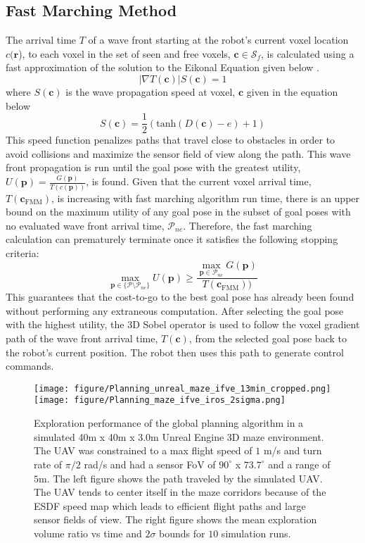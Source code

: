 \documentclass[letterpaper, 10 pt, conference]{ieeeconf}  %
\begin{document}
\subsection{Fast Marching Method}
The arrival time $T$ of a wave front starting at the robot's current voxel location $c(\bm{r}$), to each voxel in the set of seen and free voxels, $\bm{c} \in \mathcal{S}_f$, is calculated using a fast approximation of the solution to the Eikonal Equation given below \cite{hassouna2007multistencils} \cite{kroon2020MSFM}.
\begin{equation}
    |\nabla T(\bm{c})|S(\bm{c}) = 1
\end{equation}
where $S(\bm{c})$ is the wave propagation speed at voxel, $\bm{c}$ given in the equation below
\begin{equation}
    S(\bm{c}) = \frac{1}{2}(\text{tanh}(D(\bm{c}) - e) + 1)
\end{equation}
This speed function penalizes paths that travel close to obstacles in order to avoid collisions and maximize the sensor field of view along the path.  This wave front propagation is run until the goal pose with the greatest utility, $U(\bm{p}) = \frac{G(\bm{p})}{T(c(\bm{p}))}$, is found.  Given that the current voxel arrival time, $T(\bm{c}_{\text{FMM}})$, is increasing with fast marching algorithm run time, there is an upper bound on the maximum utility of any goal pose in the subset of goal poses with no evaluated wave front arrival time, $\mathcal{P}_{ne}$.  Therefore, the fast marching calculation can prematurely terminate once it satisfies the following stopping criteria:
\begin{equation}
     \max_{\textbf{p} \in \{ \mathcal{P} \setminus \mathcal{P}_{ne} \}}{U(\bm{p})} \geq \frac{\max_{\bm{p} \in \mathcal{P}_{ne}} G(\bm{p})}{ T(\bm{c}_{\text{FMM}}))}
\end{equation}
This guarantees that the cost-to-go to the best goal pose has already been found without performing any extraneous computation.  After selecting the goal pose with the highest utility, the 3D Sobel operator is used to follow the voxel gradient path of the wave front arrival time, $T(\bm{c})$, from the selected goal pose back to the robot's current position.  The robot then uses this path to generate control commands.

\begin{figure}
		\texttt{[image: figure/Planning\_unreal\_maze\_ifve\_13min\_cropped.png]}
		\texttt{[image: figure/Planning\_maze\_ifve\_iros\_2sigma.png]}
		\caption{Exploration performance of the global planning algorithm in a simulated 40m x 40m x 3.0m Unreal Engine 3D maze environment. The UAV was constrained to a max flight speed of $1$ m/s and turn rate of $\pi/2$ rad/s and had a sensor FoV of $90^{\circ}$ x  $73.7^{\circ}$ and a range of $5$m. The left figure shows the path traveled by the simulated UAV.  The UAV tends to center itself in the maze corridors because of the ESDF speed map which leads to efficient flight paths and large sensor fields of view.  The right figure shows the mean exploration volume ratio vs time and $2\sigma$ bounds for $10$ simulation runs.}
		\label{fig:Planning_maze_simulation_volume_vs_time}
\end{figure}
\end{document}

